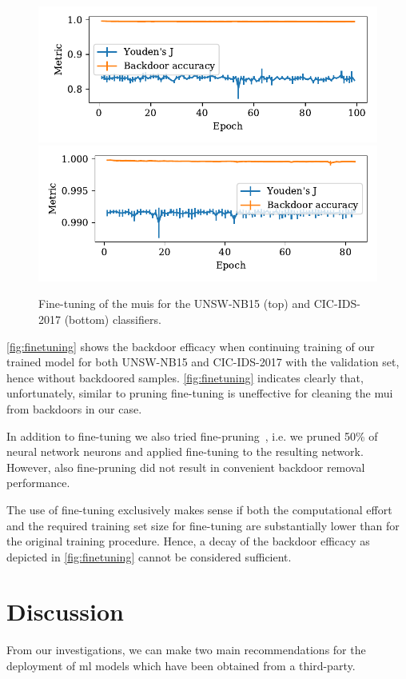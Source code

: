 \documentclass[10pt,sigconf,letterpaper,dvipsnames]{acmart}
\begin{document}
\begin{figure}[t]
\includegraphics[width=\columnwidth]{figures/finetuning_2015.pdf}
\includegraphics[width=\columnwidth]{figures/finetuning_2017.pdf}
\caption{Fine-tuning of the \glspl{mui} for the UNSW-NB15 (top) and CIC-IDS-2017 (bottom) classifiers.}
\label{fig:finetuning}
\end{figure}
\autoref{fig:finetuning} shows the backdoor efficacy when continuing training of our trained model for both UNSW-NB15 and CIC-IDS-2017 with the validation set, hence without backdoored samples. 
\autoref{fig:finetuning} indicates clearly that, unfortunately, similar to pruning fine-tuning is uneffective for cleaning the \gls{mui} from backdoors in our case. 

In addition to fine-tuning we also tried fine-pruning~\cite{liu_fine-pruning:_2018}, i.e. we pruned 50\% of neural network neurons and applied fine-tuning to the resulting network. However, also fine-pruning did not result in convenient backdoor removal performance.

The use of fine-tuning exclusively makes  sense if both the computational effort and the required training set size for fine-tuning are substantially lower than for the original training procedure. Hence, a decay of the backdoor efficacy as depicted in \autoref{fig:finetuning} cannot be considered sufficient.

\section{Discussion}
From our investigations, we can make two main recommendations for the deployment of \gls{ml} models which have been obtained from a third-party.
\end{document}
